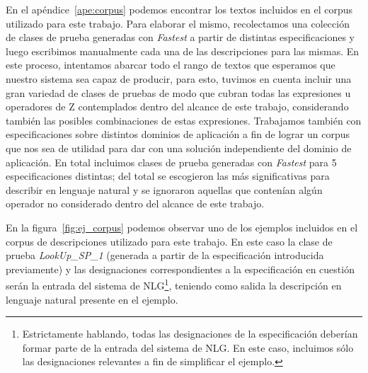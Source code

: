 En el apéndice~\ref{ape:corpus} podemos encontrar los textos incluidos en el corpus utilizado para este trabajo. Para elaborar el mismo, recolectamos una colección de clases de prueba generadas con \emph{Fastest} a partir de distintas especificaciones y luego escribimos manualmente cada una de las descripciones para las mismas. En este proceso, intentamos abarcar todo el rango de textos que esperamos que nuestro sistema sea capaz de producir, para esto, tuvimos en cuenta incluir una gran variedad de clases de pruebas de modo que cubran todas las expresiones u operadores de Z contemplados dentro del alcance de este trabajo, considerando también las posibles combinaciones de estas expresiones. Trabajamos también con especificaciones sobre distintos dominios de aplicación a fin de lograr un corpus que nos sea de utilidad para dar con una solución independiente del dominio de aplicación. En total incluimos clases de prueba generadas con \emph{Fastest} para 5 especificaciones distintas; del total se escogieron las más significativas para describir en lenguaje natural y se ignoraron aquellas que contenían algún operador no considerado dentro del alcance de este trabajo.


En la figura~\ref{fig:ej_corpus} podemos observar uno de los ejemplos incluidos en el corpus de descripciones utilizado para este trabajo. En este caso la clase de prueba \emph{LookUp\_SP\_1} (generada a partir de la especificación introducida previamente) y las designaciones correspondientes a la especificación en cuestión serán la entrada del sistema de NLG\footnote{Estrictamente hablando, todas las designaciones de la especificación deberían formar parte de la entrada del sistema de NLG. En este caso, incluimos sólo las designaciones relevantes a fin de simplificar el ejemplo.}, teniendo como salida la descripción en lenguaje natural presente en el ejemplo.

